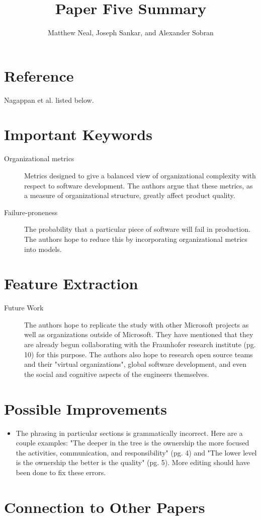 \documentclass[english]{article}
\begin{document}
\title{Paper Five Summary}


\author{Matthew Neal, Joseph Sankar, and Alexander Sobran}

\maketitle

\section*{Reference}

Nagappan et al. \cite{Nagappan} listed below.


\section*{Important Keywords}
\begin{description}
\item [{Organizational metrics}] Metrics designed to give a balanced view of organizational complexity with respect to software development. The authors argue that these metrics, as a measure of organizational structure, greatly affect product quality.
\item[{Failure-proneness}] The probability that a particular piece of software will fail in production. The authors hope to reduce this by incorporating organizational metrics into models.
\end{description}

\section*{Feature Extraction}
\begin{description}
\item[{Future Work}] The authors hope to replicate the study with other Microsoft projects as well as organizations outside of Microsoft. They have mentioned that they are already begun collaborating with the Fraunhofer research institute (pg. 10) for this purpose. The authors also hope to research open source teams and their "virtual organizations", global software development, and even the social and cognitive aspects of the engineers themselves.
\end{description}



\section*{Possible Improvements}
\begin{itemize}
\item The phrasing in particular sections is grammatically incorrect. Here are a couple examples: "The deeper in the tree is the ownership the more focused the activities, communication, and responsibility" (pg. 4) and "The lower level is the ownership the better is the quality" (pg. 5). More editing should have been done to fix these errors.
\end{itemize}

\section*{Connection to Other Papers}




\end{document}

